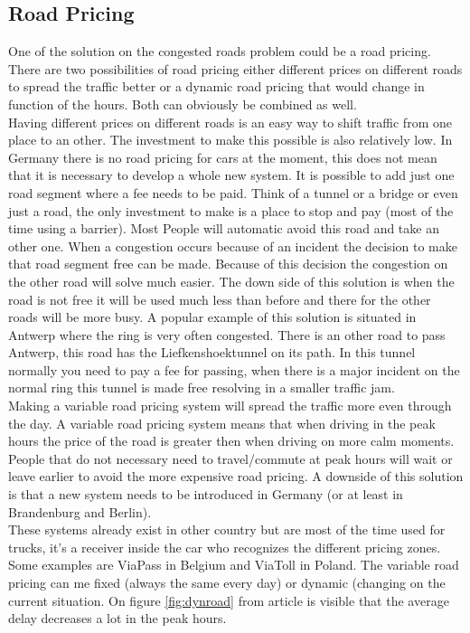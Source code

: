 \subsection{Road Pricing} \label{subsec:RoadTax}
One of the solution on the congested roads problem could be a road pricing. There are two possibilities of  road pricing either different prices on different roads to spread the traffic better or a dynamic road pricing that would change in function of the hours. Both can obviously be combined as well. \\ \newline
Having different prices on different roads is an easy way to shift  traffic from one place to an other. The investment to make this possible is also relatively low. In Germany there is no road pricing for cars at the moment, this does not mean that it is necessary to develop a whole new system. It is possible to add just one road segment where a fee needs to be paid. Think of a tunnel or a bridge or even just a road, the only investment to make is a place to stop and pay (most of the time using a barrier). Most People will automatic avoid this road and take an other one. When a congestion occurs because of an incident the decision to make that road segment free can be made. Because of this decision the congestion on the other road will solve much easier. The down side of this solution is when the road is not free it will be used much less than before and there for the other roads will be more busy. A popular example of this solution is situated in Antwerp where the ring is very often congested. There is an other road to pass Antwerp, this road has the Liefkenshoektunnel on its path. In this tunnel normally you need to pay a fee for passing, when there is a major incident on the normal ring this tunnel is made free resolving in a smaller traffic jam.     \\ \newline
Making a variable road pricing system will spread the traffic more even through the day. A variable road pricing system means that when driving in the peak hours the price of the road is greater then when driving on more calm moments. People that do not necessary need to travel/commute at peak hours will wait or leave earlier to avoid the more expensive road pricing. A downside of this solution is that a new system needs to be introduced in Germany (or at least in Brandenburg and Berlin). \\ \newline
These systems already exist in other country but are most of the time used for trucks, it's a receiver inside the car who recognizes the different pricing zones. Some examples are ViaPass in Belgium and ViaToll in Poland. The variable road pricing can me fixed (always the same every day) or dynamic (changing on the current situation. On figure \ref{fig:dynroad} from article \cite{dynRoadPrice} is visible that the average delay decreases a lot in the peak hours.

